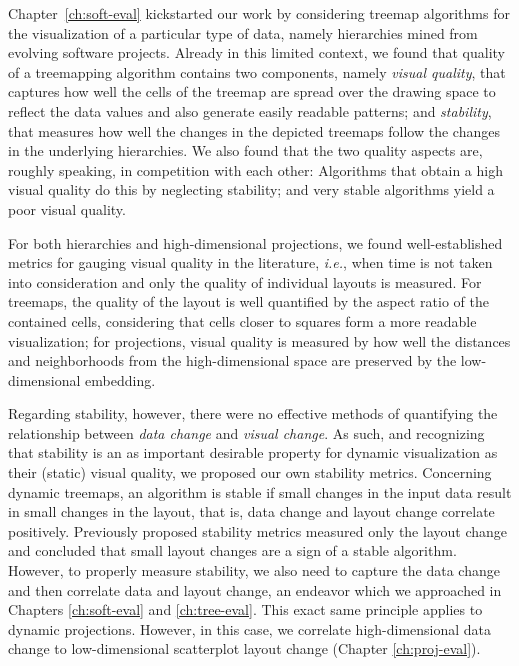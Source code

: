 Chapter~\ref{ch:soft-eval} kickstarted our work by considering treemap algorithms for the visualization of a particular type of data, namely hierarchies mined from evolving software projects. Already in this limited context, we found that quality of a treemapping algorithm contains two components, namely \emph{visual quality}, that captures how well the cells of the treemap are spread over the drawing space to reflect the data values and also generate easily readable patterns; and \emph{stability}, that measures how well the changes in the depicted treemaps follow the changes in the underlying hierarchies. We also found that the two quality aspects are, roughly speaking, in competition with each other: Algorithms that obtain a high visual quality do this by neglecting stability; and very stable algorithms yield a poor visual quality.

For both hierarchies and high-dimensional projections, we found well-established metrics for gauging visual quality in the literature, \emph{i.e.}, when time is not taken into consideration and only the quality of individual layouts is measured. For treemaps, the quality of the layout is well quantified by the aspect ratio of the contained cells, considering that cells closer to squares form a more readable visualization; for projections, visual quality is measured by how well the distances and neighborhoods from the high-dimensional space are preserved by the low-dimensional embedding.

Regarding stability, however, there were no effective methods of quantifying the relationship between \emph{data change} and \emph{visual change}. As such, and recognizing that stability is an as important desirable property for dynamic visualization as their (static) visual quality, we proposed our own stability metrics. Concerning dynamic treemaps, an algorithm is stable if small changes in the input data result in small changes in the layout, that is, data change and layout change correlate positively. Previously proposed stability metrics measured only the layout change and concluded that small layout changes are a sign of a stable algorithm. However, to properly measure stability, we also need to capture the data change and then correlate data and layout change, an endeavor which we approached in Chapters \ref{ch:soft-eval} and \ref{ch:tree-eval}. This exact same principle applies to dynamic projections. However, in this case, we correlate high-dimensional data change to low-dimensional scatterplot layout change (Chapter \ref{ch:proj-eval}).  

